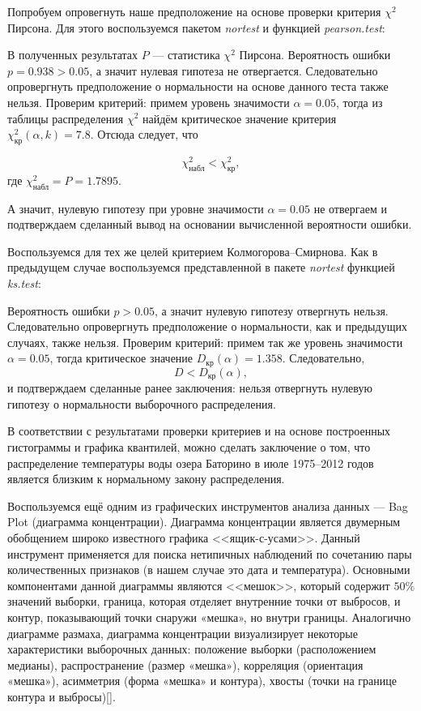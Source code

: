 Попробуем опровегнуть наше предположение на основе проверки критерия $\chi^2$ Пирсона. Для этого воспользуемся пакетом \textit{nortest} и функцией \textit{pearson.test}:

В полученных результатах $P$ --- статистика $\chi^2$ Пирсона. Вероятность ошибки $p = 0.938 > 0.05$, а значит нулевая гипотеза не отвергается. Следовательно опровергнуть предположение о нормальности на основе данного теста также нельзя. Проверим критерий: примем уровень значимости $\alpha = 0.05$, тогда из таблицы распределения $\chi^2$ найдём критическое значение критерия $\chi_{\textrm{кр}}^2(\alpha, k) = 7.8$. Отсюда следует, что

\begin{equation*}
	\chi_{\textrm{набл}}^2 < \chi_{\textrm{кр}}^2,
\end{equation*}
где $\chi_{\textrm{набл}}^2 = P = 1.7895$.

А значит, нулевую гипотезу при уровне значимости $\alpha = 0.05$ не отвергаем и подтверждаем сделанный вывод на основании вычисленной вероятности ошибки. 

Воспользуемся для тех же целей критерием Колмогорова--Смирнова. Как в предыдущем случае воспользуемся представленной в пакете \textit{nortest} функцией \textit{ks.test}:

Вероятность ошибки $p > 0.05$, а значит нулевую гипотезу отвергнуть нельзя. Следовательно опровергнуть предположение о нормальности, как и предыдущих случаях, также нельзя. Проверим критерий: примем так же уровень значимости $\alpha = 0.05$, тогда критическое значение $D_{\textrm{кр}}(\alpha) = 1.358$. Следовательно,
\begin{equation*}
	D < D_{\textrm{кр}}(\alpha),
\end{equation*}
и подтверждаем сделанные ранее заключения: нельзя отвергнуть нулевую гипотезу о нормальности выборочного распределения.

В соответствии с результатами проверки критериев и на основе построенных гистограммы и графика квантилей, можно сделать заключение о том, что распределение температуры воды озера Баторино в июле 1975--2012 годов является близким к нормальному закону распределения.

Воспользуемся ещё одним из графических инструментов анализа данных --- Bag Plot (диаграмма концентрации). 
Диаграмма концентрации является двумерным обобщением широко известного графика <<ящик-с-усами>>. Данный инструмент применяется для поиска нетипичных наблюдений по сочетанию пары количественных признаков (в нашем случае это дата и температура). Основными компонентами данной диаграммы являются <<мешок>>, который 
содержит $50\%$ значений выборки, граница, которая отделяет внутренние точки от выбросов, и контур, показывающий точки снаружи «мешка», но внутри границы. Аналогично диаграмме размаха, диаграмма концентрации 
визуализирует некоторые характеристики выборочных данных: положение выборки (расположением медианы), распространение (размер «мешка»), корреляция (ориентация «мешка»), асимметрия (форма «мешка» и контура), 
хвосты (точки на границе контура и выбросы)[].

